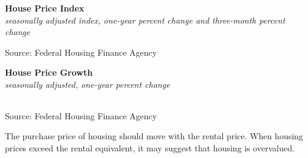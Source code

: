 \documentclass{report}
\makeatletter
\newcommand{\tbllink}[1]{\href{https://raw.githubusercontent.com/bdecon/US-chartbook/master/chartbook/data/#1}{\faTable}}
\newcommand*\short[1]{\expandafter\@gobbletwo\number\numexpr#1\relax}
\newcommand{\dateaxisticks}{
		date coordinates in=x, axis line style={draw=none},
		xmax={2023-02-15},
		max space between ticks=40,	    
		xtick={{1990-01-01}, {1992-01-01}, {1994-01-01}, 
			{1996-01-01}, {1998-01-01}, {2000-01-01}, 
			{2002-01-01}, {2004-01-01}, {2006-01-01},
			{2008-01-01}, {2010-01-01}, {2012-01-01}, {2014-01-01},
		    {2016-01-01}, {2018-01-01}, {2020-01-01}, {2022-01-01}, 
		    {2024-01-01}, {2026-01-01}},
		minor xtick={{1989-01-01}, {1991-01-01}, {1993-01-01},
			{1995-01-01}, {1997-01-01}, {1999-01-01}, 
			{2001-01-01}, {2003-01-01}, {2005-01-01}, {2007-01-01},
		    {2009-01-01}, {2011-01-01}, {2013-01-01}, {2015-01-01},
		    {2017-01-01}, {2019-01-01}, {2021-01-01}, {2023-01-01}, 
		    {2025-01-01}, {2027-01-01}},
		enlarge y limits={0.06}, enlarge x limits={0.01},
		}
\newcommand{\bbar}[2]{extra #1 ticks = {{#2}}, extra #1 tick labels = ,
		extra #1 tick style = {grid=major, grid style={thick, black!25}},}
\newcommand{\stdline}[4]{\addplot[very thick, no markers, color=#1] 
		table [x=#2, y=#3, col sep=comma] {#4};	}
\newcommand{\thickline}[4]{\addplot[ultra thick, no markers, color=#1] 
		table [x=#2, y=#3, col sep=comma] {#4};	}
\newcommand{\rebars}{
		\fill[color=black!10] (axis cs:{2007-12-01},\pgfkeysvalueof{/pgfplots/ymin}) rectangle 
			(axis cs:{2009-07-01}, \pgfkeysvalueof{/pgfplots/ymax});
		\fill[color=black!10] (axis cs:{2001-03-01},\pgfkeysvalueof{/pgfplots/ymin}) rectangle 
			(axis cs:{2001-11-01}, \pgfkeysvalueof{/pgfplots/ymax});
		\fill[color=black!10] (axis cs:{2020-02-01},\pgfkeysvalueof{/pgfplots/ymin}) rectangle 
			(axis cs:{2020-05-01}, \pgfkeysvalueof{/pgfplots/ymax});}
\makeatother
\begin{document}
{\begin{minipage}{0.76\textwidth}
\normalsize \textbf{House Price Index}\\
\footnotesize{\textit{seasonally adjusted index, one-year percent change and three-month percent change}}
\vspace{3.4cm}

\hspace{4mm} 

\footnotesize{Source: Federal Housing Finance Agency} \hfill \tbllink{hpi.csv}
\vspace{1mm}

\normalsize{\textbf{House Price Growth}}\\
\footnotesize{\textit{seasonally adjusted, one-year percent change}}\\
\hspace*{-3mm} \noindent {} \setlength{\tabcolsep}{2.1pt} \color{black!90}
		{\renewcommand{\arraystretch}{1.45}
		 \begin{tabular}{p{25mm} R{8mm} R{8mm} R{8mm} R{8mm} R{8mm} R{8mm} R{8mm} R{12.0mm} R{10.8mm}}
			  \hline
		\end{tabular}}
		
	\vspace{-2mm}
\footnotesize{Source: Federal Housing Finance Agency} \hfill \tbllink{hpi.csv}
\end{minipage}
\vspace{3mm}

\begin{minipage}{0.33\textwidth}
\small The purchase price of housing should move with the rental price. When housing prices exceed the rental equivalent, it may suggest that housing is overvalued. 


\end{minipage}}
\end{document}
